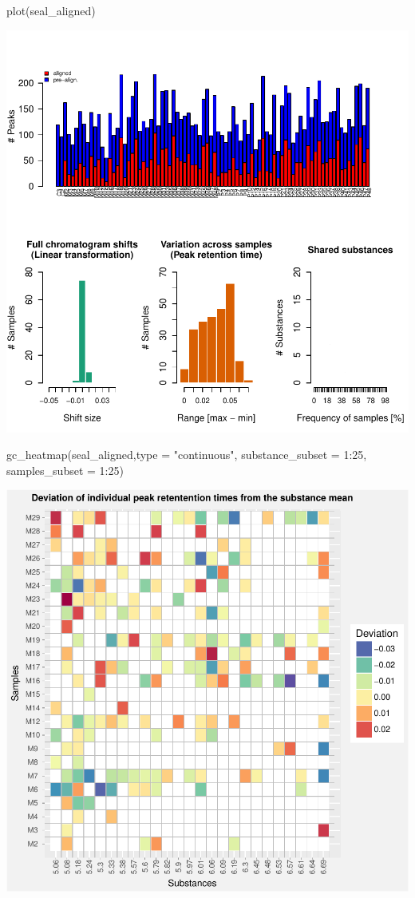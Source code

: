 \begin{Schunk}
\begin{Sinput}
plot(seal_aligned)
\end{Sinput}

\includegraphics{ottensmann-stoffel-hoffman_files/figure-latex/unnamed-chunk-5-1} \begin{Sinput}
gc_heatmap(seal_aligned,type = "continuous", substance_subset = 1:25, samples_subset = 1:25)
\end{Sinput}

\includegraphics{ottensmann-stoffel-hoffman_files/figure-latex/unnamed-chunk-5-2} \end{Schunk}

